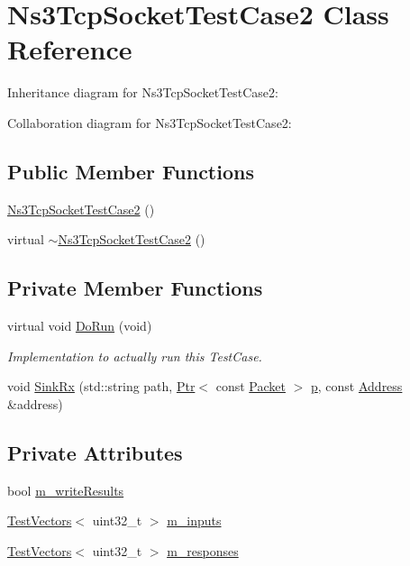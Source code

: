 \hypertarget{classNs3TcpSocketTestCase2}{}\section{Ns3\+Tcp\+Socket\+Test\+Case2 Class Reference}
\label{classNs3TcpSocketTestCase2}


Inheritance diagram for Ns3\+Tcp\+Socket\+Test\+Case2\+:


Collaboration diagram for Ns3\+Tcp\+Socket\+Test\+Case2\+:
\subsection*{Public Member Functions}
\begin{DoxyCompactItemize}
\item 
\hyperlink{classNs3TcpSocketTestCase2_a4aa0e7c404d0b54ea49d669ed36cebfb}{Ns3\+Tcp\+Socket\+Test\+Case2} ()
\item 
virtual \hyperlink{classNs3TcpSocketTestCase2_a4fb1c13e2e47b9ed36b52b33639299c7}{$\sim$\+Ns3\+Tcp\+Socket\+Test\+Case2} ()
\end{DoxyCompactItemize}
\subsection*{Private Member Functions}
\begin{DoxyCompactItemize}
\item 
virtual void \hyperlink{classNs3TcpSocketTestCase2_a5af09b49ff61fd2b62cfd9bbff792541}{Do\+Run} (void)
\begin{DoxyCompactList}\small\item\em Implementation to actually run this Test\+Case. \end{DoxyCompactList}\item 
void \hyperlink{classNs3TcpSocketTestCase2_a1e8bdfa19b113aea39c3dacb6dc7a2da}{Sink\+Rx} (std\+::string path, \hyperlink{classns3_1_1Ptr}{Ptr}$<$ const \hyperlink{classns3_1_1Packet}{Packet} $>$ \hyperlink{lte__link__budget__x2__handover__measures_8m_ac9de518908a968428863f829398a4e62}{p}, const \hyperlink{classns3_1_1Address}{Address} \&address)
\end{DoxyCompactItemize}
\subsection*{Private Attributes}
\begin{DoxyCompactItemize}
\item 
bool \hyperlink{classNs3TcpSocketTestCase2_ad2709b26e5e9099798d28a6f3ec3aef9}{m\+\_\+write\+Results}
\item 
\hyperlink{classns3_1_1TestVectors}{Test\+Vectors}$<$ uint32\+\_\+t $>$ \hyperlink{classNs3TcpSocketTestCase2_a4415da1b4f4e17ba36065c6ed526f46c}{m\+\_\+inputs}
\item 
\hyperlink{classns3_1_1TestVectors}{Test\+Vectors}$<$ uint32\+\_\+t $>$ \hyperlink{classNs3TcpSocketTestCase2_a417144b7d1e3b0270ada62132567de2e}{m\+\_\+responses}
\end{DoxyCompactItemize}
